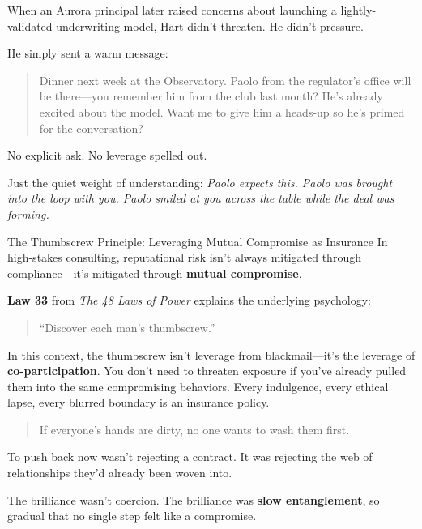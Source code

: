 \medskip

When an Aurora principal later raised concerns about launching a lightly-validated underwriting model, Hart didn’t threaten. He didn’t pressure.

He simply sent a warm message:

\begin{quote}
Dinner next week at the Observatory. Paolo from the regulator’s office will be there—you remember him from the club last month? He’s already excited about the model. Want me to give him a heads-up so he’s primed for the conversation?
\end{quote}

No explicit ask. No leverage spelled out.

Just the quiet weight of understanding:  \textit{Paolo expects this. Paolo was brought into the loop with you. Paolo smiled at you across the table while the deal was forming.}

\begin{HistoricalSidebar}{The Thumbscrew Principle: Leveraging Mutual Compromise as Insurance}
In high-stakes consulting, reputational risk isn’t always mitigated through compliance—it’s mitigated through \textbf{mutual compromise}.  

\medskip

\textbf{Law 33} from \textit{The 48 Laws of Power} explains the underlying psychology:  

\begin{quote}
“Discover each man’s thumbscrew.”  
\end{quote}

In this context, the thumbscrew isn’t leverage from blackmail—it’s the leverage of \textbf{co-participation}. You don’t need to threaten exposure if you’ve already pulled them into the same compromising behaviors. Every indulgence, every ethical lapse, every blurred boundary is an insurance policy.  

\begin{quote}
If everyone’s hands are dirty, no one wants to wash them first.
\end{quote}
\end{HistoricalSidebar}

To push back now wasn’t rejecting a contract.  It was rejecting the web of relationships they’d already been woven into.

The brilliance wasn’t coercion.  The brilliance was \textbf{slow entanglement}, so gradual that no single step felt like a compromise.

